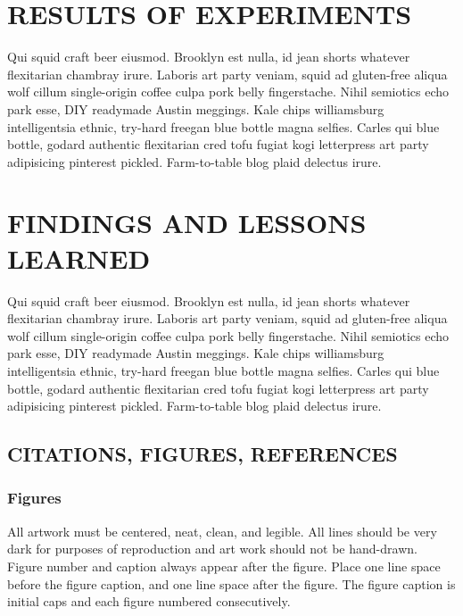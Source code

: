 \section{RESULTS OF EXPERIMENTS}
\label{sec:results}

Qui squid craft beer eiusmod. Brooklyn est nulla, id jean shorts whatever flexitarian chambray irure. Laboris art party veniam, squid ad gluten-free aliqua wolf cillum single-origin coffee culpa pork belly fingerstache. Nihil semiotics echo park esse, DIY readymade Austin meggings. Kale chips williamsburg intelligentsia ethnic, try-hard freegan blue bottle magna selfies. Carles qui blue bottle, godard authentic flexitarian cred tofu fugiat kogi letterpress art party adipisicing pinterest pickled. Farm-to-table blog plaid delectus irure.



\section{FINDINGS AND LESSONS LEARNED}
\label{sec:conclusion}

Qui squid craft beer eiusmod. Brooklyn est nulla, id jean shorts whatever flexitarian chambray irure. Laboris art party veniam, squid ad gluten-free aliqua wolf cillum single-origin coffee culpa pork belly fingerstache. Nihil semiotics echo park esse, DIY readymade Austin meggings. Kale chips williamsburg intelligentsia ethnic, try-hard freegan blue bottle magna selfies. Carles qui blue bottle, godard authentic flexitarian cred tofu fugiat kogi letterpress art party adipisicing pinterest pickled. Farm-to-table blog plaid delectus irure.




\subsection{CITATIONS, FIGURES, REFERENCES}

\subsubsection{Figures} 

All artwork must be centered, neat, clean, and legible.  All lines
should be very dark for purposes of reproduction and art work
should not be hand-drawn.  Figure number and caption always appear
after the figure.  Place one line space before the figure caption,
and one line space after the figure. The figure caption is initial
caps and each figure numbered consecutively.

